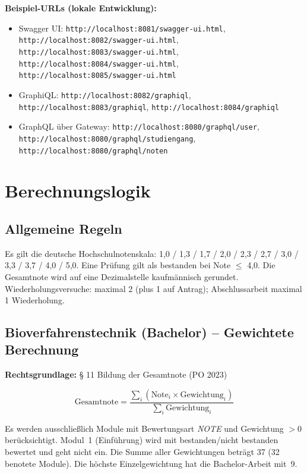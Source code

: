 \documentclass[12pt,a4paper,ngerman]{article}
\begin{document}
\textbf{Beispiel-URLs (lokale Entwicklung):}
\begin{itemize}[nosep]
\item Swagger UI: \texttt{http://localhost:8081/swagger-ui.html}, \texttt{http://localhost:8082/swagger-ui.html}, \texttt{http://localhost:8083/swagger-ui.html}, \texttt{http://localhost:8084/swagger-ui.html}, \texttt{http://localhost:8085/swagger-ui.html}
\item GraphiQL: \texttt{http://localhost:8082/graphiql}, \texttt{http://localhost:8083/graphiql}, \texttt{http://localhost:8084/graphiql}
\item GraphQL über Gateway: \texttt{http://localhost:8080/graphql/user}, \texttt{http://localhost:8080/graphql/studiengang}, \texttt{http://localhost:8080/graphql/noten}
\end{itemize}

\section{Berechnungslogik}

\subsection{Allgemeine Regeln}

Es gilt die deutsche Hochschulnotenskala: 1,0 / 1,3 / 1,7 / 2,0 / 2,3 / 2,7 / 3,0 / 3,3 / 3,7 / 4,0 / 5,0. Eine Prüfung gilt als bestanden bei Note $\leq$ 4,0. Die Gesamtnote wird auf eine Dezimalstelle kaufmännisch gerundet. Wiederholungsversuche: maximal 2 (plus 1 auf Antrag); Abschlussarbeit maximal 1 Wiederholung.

\subsection{Bioverfahrenstechnik (Bachelor) -- Gewichtete Berechnung}

\textbf{Rechtsgrundlage:} § 11 Bildung der Gesamtnote (PO 2023)

\[
\text{Gesamtnote} = \frac{\sum_{i} (\text{Note}_i \times \text{Gewichtung}_i)}{\sum_{i} \text{Gewichtung}_i}
\]

Es werden ausschließlich Module mit Bewertungsart \textit{NOTE} und Gewichtung $> 0$ berücksichtigt. Modul~1 (Einführung) wird mit \glqq bestanden/nicht bestanden\grqq{} bewertet und geht nicht ein. Die Summe aller Gewichtungen beträgt 37 (32 benotete Module). Die höchste Einzelgewichtung hat die Bachelor-Arbeit mit~9.
\end{document}
